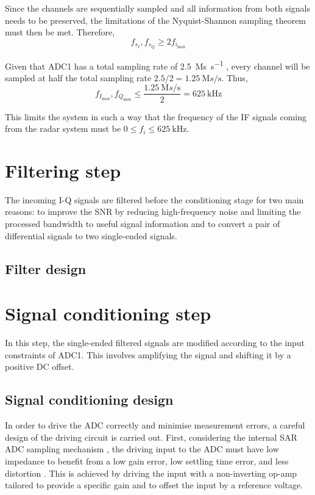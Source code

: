 Since the channels are sequentially sampled and all information from both signals needs to be preserved, the limitations of the Nyquist-Shannon sampling theorem must then be met. Therefore,
\begin{equation} \label{eqn:nyquist_sampling}
	f_{s_{I}}, f_{s_{Q}} \ge 2 f_{i_{\max}}
\end{equation}

Given that ADC1 has a total sampling rate of \SI{2.5}{\mega s\per\second} \cite[p.~103]{STMicroelectronics2022}, every channel will be sampled at half the total sampling rate $2.5/2 = \SI{1.25}{\mega s\per\second}$. Thus,
\begin{equation} \label{eqn:nyquist_sampling}
	f_{I_{\max}}, f_{Q_{\max}} \le \frac{\SI{1.25}{\mega s\per\second}}{2} = \SI{625}{\kilo\hertz}
\end{equation}

This limits the system in such a way that the frequency of the IF signals coming from the radar system must be $ 0 \le f_i \le \SI{625}{\kilo\hertz}$.

\section{Filtering step}
The incoming I-Q signals are filtered before the conditioning stage for two main reasons: to improve the SNR by reducing high-frequency noise and limiting the processed bandwidth to useful signal information and to convert a pair of differential signals to two single-ended signals.
\subsection{Filter design}
\section{Signal conditioning step}
In this step, the single-ended filtered signals are modified according to the input constraints of ADC1. This involves amplifying the signal and shifting it by a positive DC offset.
\subsection{Signal conditioning design}
In order to drive the ADC correctly and minimise measurement errors, a careful design of the driving circuit is carried out. First, considering the internal SAR ADC sampling mechanism \cite[pp.~356,~363]{STMicroelectronics2022a}, the driving input to the ADC must have low impedance to benefit from a low gain error, low settling time error, and less distortion \cite{Franco2014}. This is achieved by driving the input with a non-inverting op-amp tailored to provide a specific gain and to offset the input by a reference voltage.


